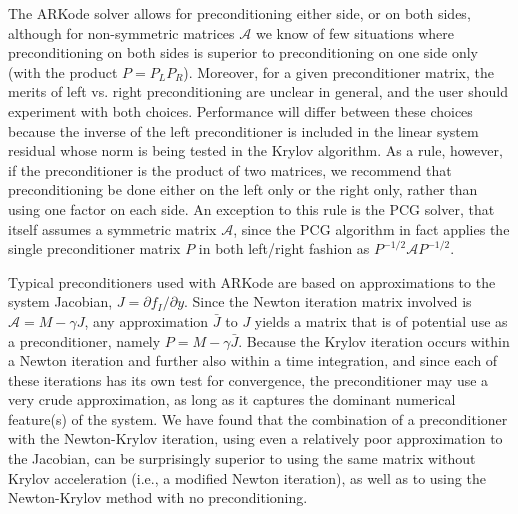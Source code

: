\documentclass[letterpaper,10pt,english]{sphinxmanual}
\begin{document}
The ARKode solver allows for preconditioning either side, or on both
sides, although for non-symmetric matrices ${\mathcal A}$ we
know of few situations where preconditioning on both sides is superior
to preconditioning on one side only (with the product $P = P_L
P_R$).  Moreover, for a given preconditioner matrix, the merits of left
vs. right preconditioning are unclear in general, and the user should
experiment with both choices.  Performance will differ between these
choices because the inverse of the left preconditioner is included in
the linear system residual whose norm is being tested in the Krylov
algorithm.  As a rule, however, if the preconditioner is the product
of two matrices, we recommend that preconditioning be done either on
the left only or the right only, rather than using one factor on each
side.  An exception to this rule is the PCG solver, that itself
assumes a symmetric matrix ${\mathcal A}$, since the PCG
algorithm in fact applies the single preconditioner matrix $P$
in both left/right fashion as $P^{-1/2} {\mathcal A} P^{-1/2}$.

Typical preconditioners used with ARKode are based on approximations
to the system Jacobian, $J = \partial f_I / \partial y$.  Since
the Newton iteration matrix involved is ${\mathcal A} = M - \gamma J$, any
approximation $\bar{J}$ to $J$ yields a matrix that is of
potential use as a preconditioner, namely $P = M - \gamma
\bar{J}$. Because the Krylov iteration occurs within a Newton
iteration and further also within a time integration, and since each
of these iterations has its own test for convergence, the
preconditioner may use a very crude approximation, as long as it
captures the dominant numerical feature(s) of the system.  We have
found that the combination of a preconditioner with the Newton-Krylov
iteration, using even a relatively poor approximation to the Jacobian,
can be surprisingly superior to using the same matrix without Krylov
acceleration (i.e., a modified Newton iteration), as well as to using
the Newton-Krylov method with no preconditioning.
\end{document}

